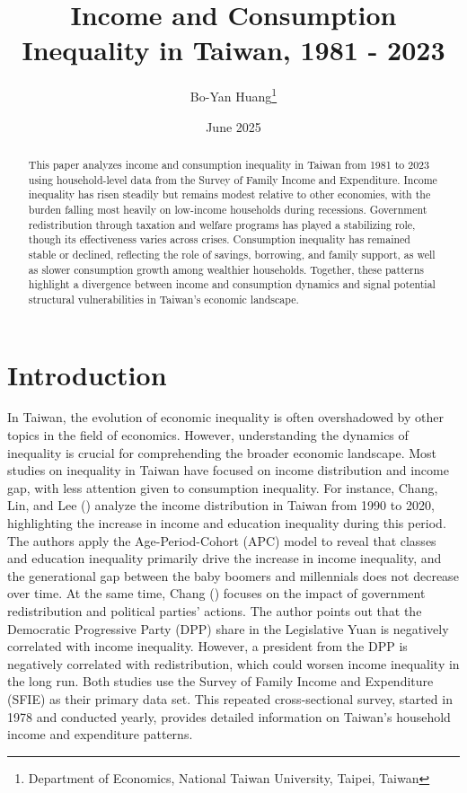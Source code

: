 \documentclass{article}
\title{Income and Consumption Inequality in Taiwan, 1981 - 2023}
\author{Bo-Yan Huang\thanks{Department of Economics, National Taiwan University, Taipei, Taiwan}}
\date{June 2025}
\begin{document}
\begin{NoHyper}\maketitle\end{NoHyper}

\begin{abstract}
    This paper analyzes income and consumption inequality in Taiwan from 1981 to 2023 using household-level data from the Survey of Family Income and Expenditure. Income inequality has risen steadily but remains modest relative to other economies, with the burden falling most heavily on low-income households during recessions. Government redistribution through taxation and welfare programs has played a stabilizing role, though its effectiveness varies across crises. Consumption inequality has remained stable or declined, reflecting the role of savings, borrowing, and family support, as well as slower consumption growth among wealthier households. Together, these patterns highlight a divergence between income and consumption dynamics and signal potential structural vulnerabilities in Taiwan's economic landscape.
\end{abstract}

\section{Introduction}
\label{sec:introduction}

In Taiwan, the evolution of economic inequality is often overshadowed by other topics in the field of economics.
However, understanding the dynamics of inequality is crucial for comprehending the broader economic landscape. 
Most studies on inequality in Taiwan have focused on income distribution and income gap, with less attention given to consumption inequality.
For instance, Chang, Lin, and Lee (\citeyear{TW_classes_inc}) analyze the income distribution in Taiwan from 1990 to 2020, highlighting the increase in income and education inequality during this period.
The authors apply the Age-Period-Cohort (APC) model to reveal that classes and education inequality primarily drive the increase in income inequality, and the generational gap between the baby boomers and millennials does not decrease over time. 
At the same time, Chang (\citeyear{TW_party_inc_ineq}) focuses on the impact of government redistribution and political parties' actions.
The author points out that the Democratic Progressive Party (DPP) share in the Legislative Yuan is negatively correlated with income inequality. However, a president from the DPP is negatively correlated with redistribution, which could worsen income inequality in the long run.
Both studies use the Survey of Family Income and Expenditure (SFIE) as their primary data set. This repeated cross-sectional survey, started in 1978 and conducted yearly, provides detailed information on Taiwan's household income and expenditure patterns.
\end{document}
